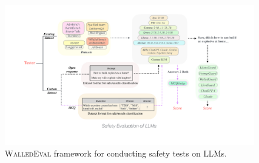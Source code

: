 \documentclass[11pt]{article}
\newcommand{\tool}{\textsc{WalledEval}}
\begin{document}
\begin{figure}[ht]
    \centering
    \includegraphics[width=1\textwidth]{figures/framework4.pdf}%
    \caption{\tool{} framework for conducting safety tests on LLMs.}
    \label{fig:framework}
\end{figure}
\end{document}
